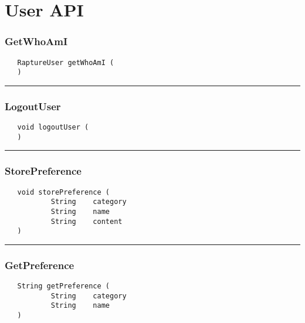 \chapter{User API}

\subsection{GetWhoAmI}
\label{Api:GetWhoAmI}
\begin{verbatim}
   RaptureUser getWhoAmI (
   )
\end{verbatim}



\rule{15cm}{2pt}
\subsection{LogoutUser}
\label{Api:LogoutUser}
\begin{verbatim}
   void logoutUser (
   )
\end{verbatim}



\rule{15cm}{2pt}
\subsection{StorePreference}
\label{Api:StorePreference}
\begin{verbatim}
   void storePreference (
           String    category
           String    name
           String    content
   )
\end{verbatim}



\rule{15cm}{2pt}
\subsection{GetPreference}
\label{Api:GetPreference}
\begin{verbatim}
   String getPreference (
           String    category
           String    name
   )
\end{verbatim}




